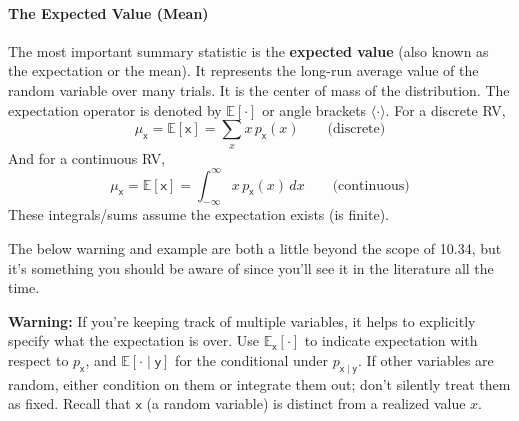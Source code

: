 \paragraph*{The Expected Value (Mean)}
The most important summary statistic is the \textbf{expected value} (also known as the expectation or the mean). It represents the long-run average value of the random variable over many trials. It is the center of mass of the distribution. The expectation operator is denoted by $\mathbb{E}[\cdot]$ or angle brackets $\langle\cdot\rangle$. For a discrete RV,
\begin{equation}
    \mu_{\mathsf{x}} = \mathbb{E}[\mathsf{x}] = \sum_{x} x \, p_{\mathsf{x}}(x) \qquad\text{(discrete)}
\end{equation}
And for a continuous RV,
\begin{equation}
    \mu_{\mathsf{x}} = \mathbb{E}[\mathsf{x}] = \int_{-\infty}^{\infty} x \, p_{\mathsf{x}}(x)\,dx \qquad\text{(continuous)}
\end{equation}
These integrals/sums assume the expectation exists (is finite).

The below warning and example are both a little beyond the scope of 10.34, but it's something you should be aware of since you'll see it in the literature all the time.
\begin{warningBox}
    \textbf{Warning:} If you're keeping track of multiple variables, it helps to explicitly specify what the expectation is over. Use $\mathbb{E}_\mathsf{x}[\cdot]$ to indicate expectation with respect to $p_\mathsf{x}$, and $\mathbb{E}[\cdot \mid \mathsf{y}]$ for the conditional under $p_{\mathsf{x}\mid \mathsf{y}}$. If other variables are random, either condition on them or integrate them out; don't silently treat them as fixed. Recall that $\mathsf{x}$ (a random variable) is distinct from a realized value $x$.
\end{warningBox}

